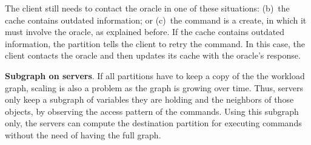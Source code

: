 The client still needs to contact the oracle in one of these situations:
(b)~the cache contains outdated information; or
(c)~the command is a create, in which it must involve the oracle, as explained before.
If the cache contains outdated information, the partition tells the client to retry the command.
In this case, the client contacts the oracle and then updates its cache with the oracle's response.

\textbf{Subgraph on servers}. If all partitions have to keep a copy of the the workload graph, scaling is also a problem as the graph is growing over time. Thus, servers only keep a subgraph of variables they are holding and the neighbors of those objects, by observing the access pattern of the commands. Using this subgraph only, the servers can compute the destination partition for executing commands without the need of having the full graph.






